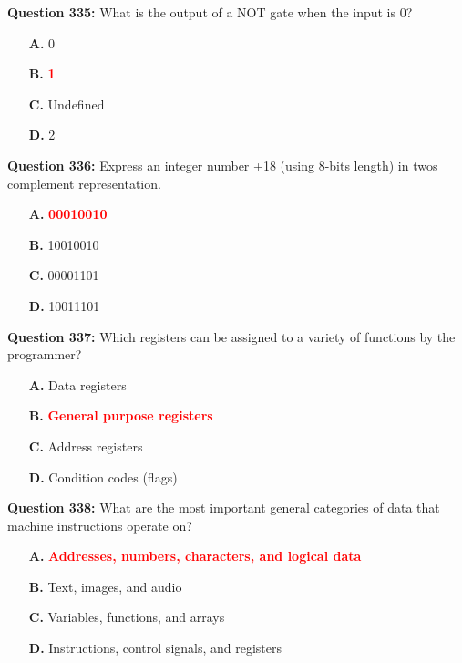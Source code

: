 \documentclass[12pt,a4paper]{article}
\begin{document}
\vspace{0.5cm}

\textbf{Question 335:} What is the output of a NOT gate when the input is 0?

\begin{itemize}
    \item[\textbf{A.}] 0
    \item[\textbf{B.}] \textcolor{red}{\textbf{1}}
    \item[\textbf{C.}] Undefined
    \item[\textbf{D.}] 2
\end{itemize}

\vspace{0.5cm}

\textbf{Question 336:} Express an integer number +18 (using 8-bits length) in twos complement representation.

\begin{itemize}
    \item[\textbf{A.}] \textcolor{red}{\textbf{00010010}}
    \item[\textbf{B.}] 10010010
    \item[\textbf{C.}] 00001101
    \item[\textbf{D.}] 10011101
\end{itemize}

\vspace{0.5cm}

\textbf{Question 337:} Which registers can be assigned to a variety of functions by the programmer?

\begin{itemize}
    \item[\textbf{A.}] Data registers
    \item[\textbf{B.}] \textcolor{red}{\textbf{General purpose registers}}
    \item[\textbf{C.}] Address registers
    \item[\textbf{D.}] Condition codes (flags)
\end{itemize}

\vspace{0.5cm}

\textbf{Question 338:} What are the most important general categories of data that machine instructions operate on?

\begin{itemize}
    \item[\textbf{A.}] \textcolor{red}{\textbf{Addresses, numbers, characters, and logical data}}
    \item[\textbf{B.}] Text, images, and audio
    \item[\textbf{C.}] Variables, functions, and arrays
    \item[\textbf{D.}] Instructions, control signals, and registers
\end{itemize}
\end{document}
